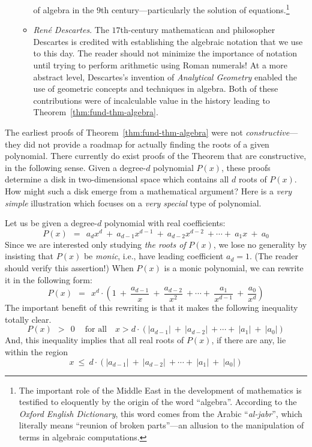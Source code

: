 \begin{itemize}
\begin{itemize}
of algebra in the $9$th century---particularly the solution of
equations.\footnote{The important role of the Middle East in the
  development of mathematics is testified to eloquently by the origin
  of the word ``algebra''.  According to the {\it Oxford English
    Dictionary}, this word comes from the Arabic ``{\it al-jabr}'',
  which literally means ``reunion of broken parts''---an allusion to
  the manipulation of terms in algebraic
  computations. }
   \item
{\it Ren\'{e} Descartes}. 
The $17$th-century mathematican and philosopher Descartes is credited
with establishing the algebraic notation that we use to this day.
The reader should not minimize the importance of notation until trying
to perform arithmetic using Roman numerals!  At a more abstract level,
Descartes's invention of {\em Analytical Geometry}
enabled the use of geometric concepts and techniques in algebra.  Both
of these contributions were of incalculable value in the history
leading to Theorem~\ref{thm:fund-thm-algebra}.
   \end{itemize}
\end{itemize}

\medskip

The earliest proofs of Theorem~\ref{thm:fund-thm-algebra} were not
{\em constructive}---they did not provide a roadmap for actually
finding the roots of a given polynomial.  There currently do exist
proofs of the Theorem that are constructive, in the following sense.
Given a degree-$d$ polynomial $P(x)$, these proofs determine a disk in
two-dimensional space which contains all $d$ roots of $P(x)$.  How
might such a disk emerge from a mathematical argument?  Here is a {\em
  very simple} illustration which focuses on a {\em very special} type
of polynomial.

Let us be given a degree-$d$ polynomial with real coefficients:
\[ P(x) \ \ = \ \ a_d x^d \ + \ a_{d-1} x^{d-1} \ + \ a_{d-2} x^{d-2}
\ + \cdots + \ a_1 x \ + \ a_0
\]
Since we are interested only studying {\em the roots of} $P(x)$, we
lose no generality by insisting that $P(x)$ be {\em monic},
 i.e., have leading coefficient $a_d = 1$.
(The reader should verify this assertion!)  When $P(x)$ is a monic
polynomial, we can rewrite it in the following form:
\[ P(x) \ \ = \ \ 
x^d \cdot \left( 1 \ + \ \frac{a_{d-1}}{x} \ + \ \frac{a_{d-2}}{x^2}
\ + \cdots + \ \frac{a_1}{x^{d-1}} \ + \ \frac{a_0}{x^d} \right)
\]
The important benefit of this rewriting is that it makes the following
inequality totally clear.
\[ P(x) \ \ > \ \ 0 \ \ \ \ \mbox{ for all } \ \ \ x >
d \cdot \left(|a_{d-1}| \ + \ |a_{d-2}|
\ + \cdots + \ |a_1| \ + \ |a_0| \right)
\]
And, this inequality implies that all real roots of $P(x)$, if there
are any, lie within the region
\[ x \ \leq \ d \cdot \left(|a_{d-1}| \ + \ |a_{d-2}| \ + \cdots +
\ |a_1| \ + \ |a_0| \right) \]

